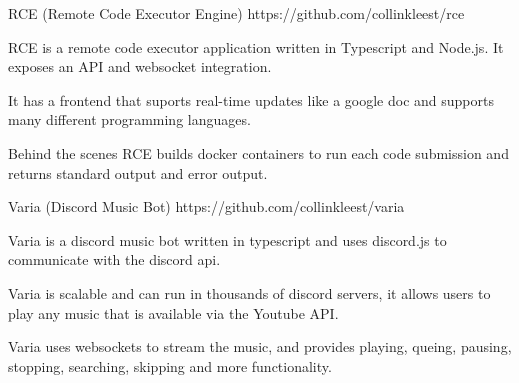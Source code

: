 

\begin{cventries}

  \cventry
    {RCE (Remote Code Executor Engine) https://github.com/collinkleest/rce} %
    {} %
    {} %
    {} %
    {
      \begin{cvitems} %
        \item {RCE is a remote code executor application written in Typescript and Node.js. It exposes an API and websocket integration.}
        \item {It has a frontend that suports real-time updates like a google doc and supports many different programming languages.}
        \item {Behind the scenes RCE builds docker containers to run each code submission and returns standard output and error output.}
      \end{cvitems}
    }
  \cventry
    {Varia (Discord Music Bot)  https://github.com/collinkleest/varia} %
    {} %
    {} %
    {} %
    {
      \begin{cvitems} %
        \item {Varia is a discord music bot written in typescript and uses discord.js to communicate with the discord api.}
        \item {Varia is scalable and can run in thousands of discord servers, it allows users to play any music that is available via the Youtube API.}
        \item {Varia uses websockets to stream the music, and provides playing, queing, pausing, stopping, searching, skipping and more functionality.}
      \end{cvitems}
    }

\end{cventries}
